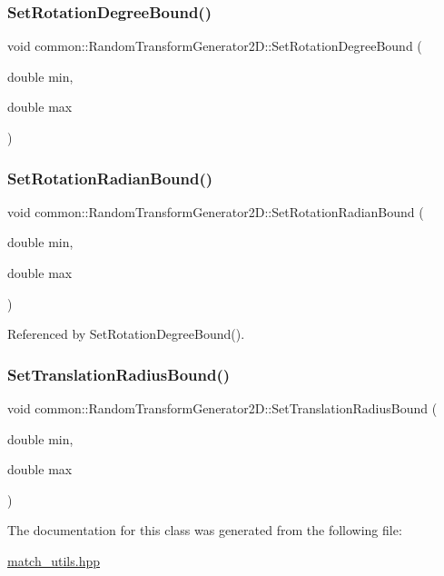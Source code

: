 \subsubsection{\texorpdfstring{Set\+Rotation\+Degree\+Bound()}{SetRotationDegreeBound()}}
{\footnotesize\ttfamily void common\+::\+Random\+Transform\+Generator2\+D\+::\+Set\+Rotation\+Degree\+Bound (\begin{DoxyParamCaption}\item[{double}]{min,  }\item[{double}]{max }\end{DoxyParamCaption})\hspace{0.3cm}{\ttfamily [inline]}}

\mbox{\label{classcommon_1_1RandomTransformGenerator2D_a1eec5f955bc92df186c436386be92006}} 
\subsubsection{\texorpdfstring{Set\+Rotation\+Radian\+Bound()}{SetRotationRadianBound()}}
{\footnotesize\ttfamily void common\+::\+Random\+Transform\+Generator2\+D\+::\+Set\+Rotation\+Radian\+Bound (\begin{DoxyParamCaption}\item[{double}]{min,  }\item[{double}]{max }\end{DoxyParamCaption})\hspace{0.3cm}{\ttfamily [inline]}}



Referenced by Set\+Rotation\+Degree\+Bound().

\mbox{\label{classcommon_1_1RandomTransformGenerator2D_a334855de9b28685e27d2bb6cb3f423c7}} 
\subsubsection{\texorpdfstring{Set\+Translation\+Radius\+Bound()}{SetTranslationRadiusBound()}}
{\footnotesize\ttfamily void common\+::\+Random\+Transform\+Generator2\+D\+::\+Set\+Translation\+Radius\+Bound (\begin{DoxyParamCaption}\item[{double}]{min,  }\item[{double}]{max }\end{DoxyParamCaption})\hspace{0.3cm}{\ttfamily [inline]}}



The documentation for this class was generated from the following file\+:\begin{DoxyCompactItemize}
\item 
\hyperlink{match__utils_8hpp}{match\+\_\+utils.\+hpp}\end{DoxyCompactItemize}
